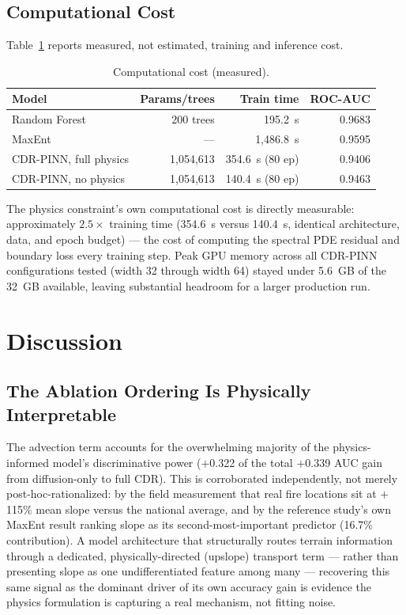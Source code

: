 \documentclass[journal]{IEEEtran}
\begin{document}
\subsection{Computational Cost}

Table~\ref{tab:cost} reports measured, not estimated, training and inference cost.

\begin{table}[t]
\centering
\caption{Computational cost (measured).}
\label{tab:cost}
\begin{tabular}{lrrr}
\toprule
\textbf{Model} & \textbf{Params/trees} & \textbf{Train time} & \textbf{ROC-AUC} \\
\midrule
Random Forest & 200 trees & 195.2~s & 0.9683 \\
MaxEnt & --- & 1,486.8~s & 0.9595 \\
CDR-PINN, full physics & 1,054,613 & 354.6~s (80 ep) & 0.9406 \\
CDR-PINN, no physics & 1,054,613 & 140.4~s (80 ep) & 0.9463 \\
\bottomrule
\end{tabular}
\end{table}

The physics constraint's own computational cost is directly measurable: approximately $2.5\times$ training time (354.6~s versus 140.4~s, identical architecture, data, and epoch budget) --- the cost of computing the spectral PDE residual and boundary loss every training step. Peak GPU memory across all CDR-PINN configurations tested (width 32 through width 64) stayed under 5.6~GB of the 32~GB available, leaving substantial headroom for a larger production run.


\section{Discussion}
\label{sec:discussion}

\subsection{The Ablation Ordering Is Physically Interpretable}

The advection term accounts for the overwhelming majority of the physics-informed model's discriminative power ($+$0.322 of the total $+$0.339 AUC gain from diffusion-only to full CDR). This is corroborated independently, not merely post-hoc-rationalized: by the field measurement that real fire locations sit at $+$115\% mean slope versus the national average, and by the reference study's own MaxEnt result ranking slope as its second-most-important predictor (16.7\% contribution). A model architecture that structurally routes terrain information through a dedicated, physically-directed (upslope) transport term --- rather than presenting slope as one undifferentiated feature among many --- recovering this same signal as the dominant driver of its own accuracy gain is evidence the physics formulation is capturing a real mechanism, not fitting noise.
\end{document}
